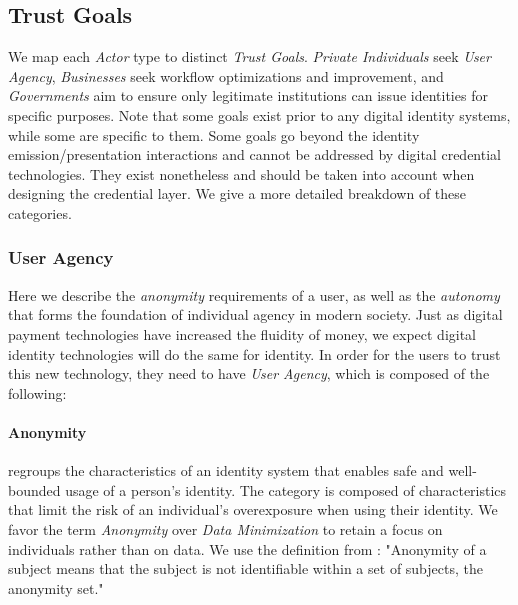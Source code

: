 \subsection{Trust Goals}
\label{subsub:trust_goals}

\vspace{1em}


We map each \emph{Actor} type to distinct \emph{Trust Goals}. \emph{Private Individuals} seek \emph{User Agency}, \emph{Businesses} seek workflow optimizations and improvement, and \emph{Governments} aim to ensure only legitimate institutions can issue identities for specific purposes.
Note that some goals exist prior to any digital identity systems, while some are specific to them. Some goals go beyond the identity emission/presentation interactions and cannot be addressed by digital credential technologies. 
They exist nonetheless and should be taken into account when designing the credential layer. We give a more detailed breakdown of these categories.


\subsubsection{User Agency} 

Here we describe the \emph{anonymity} requirements of a user, as well as the \emph{autonomy} that forms the foundation of individual agency in modern society.
Just as digital payment technologies have increased the fluidity of money, we expect digital identity technologies will do the same for identity. 
In order for the users to trust this new technology, they need to have \emph{User Agency}, which is composed of the following:

\paragraph{Anonymity} regroups the characteristics of an identity system that enables safe and well-bounded usage of a person's identity. The category is composed of characteristics that limit the risk of an individual's overexposure when using their identity. We favor the term \emph{Anonymity} over \emph{Data Minimization} to retain a focus on individuals rather than on data. We use the definition from \cite{ph10}: "Anonymity of a subject means that the subject is not identifiable within a set of
subjects, the anonymity set."

